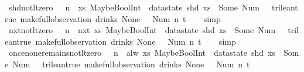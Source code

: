 \begin{isabellebody}
\ shd{\isacharunderscore}not{\isacharunderscore}lt{\isacharunderscore}zero{\isacharcolon}\ {\isachardoublequoteopen}{}\ {\isasymle}\ n\ {\isasymLongrightarrow}\ {\isacharparenleft}{\isasymlambda}xs{\isachardot}\ MaybeBoolInt\ {\isacharparenleft}{\isacharless}{\isacharparenright}\ {\isacharparenleft}datastate\ {\isacharparenleft}shd\ xs{\isacharparenright}\ {\isacharparenleft}{}{\isacharparenright}{\isacharparenright}\ {\isacharparenleft}Some\ {\isacharparenleft}Num\ {}{\isacharparenright}{\isacharparenright}\ {\isasymnoteq}\ trilean{\isachardot}true{\isacharparenright}\ {\isacharparenleft}make{\isacharunderscore}full{\isacharunderscore}observation\ drinks\ None\ {\isacharless}{}\ {\isacharcolon}{\isacharequal}\ Num\ n{\isachargreater}\ t{\isacharparenright}{\isachardoublequoteclose}\isanewline
%
\isadelimproof
\ \ %
\endisadelimproof
%
\isatagproof
{}\isamarkupfalse%
\ simp%
\endisatagproof
{\isafoldproof}%
%
\isadelimproof
\isanewline
%
\endisadelimproof
\isanewline
{}\isamarkupfalse%
\ nxt{\isacharunderscore}not{\isacharunderscore}lt{\isacharunderscore}zero{\isacharcolon}\ {\isachardoublequoteopen}{}\ {\isasymle}\ n\ {\isasymLongrightarrow}\ nxt\ {\isacharparenleft}{\isasymlambda}xs{\isachardot}\ MaybeBoolInt\ {\isacharparenleft}{\isacharless}{\isacharparenright}\ {\isacharparenleft}datastate\ {\isacharparenleft}shd\ xs{\isacharparenright}\ {\isacharparenleft}{}{\isacharparenright}{\isacharparenright}\ {\isacharparenleft}Some\ {\isacharparenleft}Num\ {}{\isacharparenright}{\isacharparenright}\ {\isasymnoteq}\ trilean{\isachardot}true{\isacharparenright}\ {\isacharparenleft}make{\isacharunderscore}full{\isacharunderscore}observation\ drinks\ None\ {\isacharless}{}\ {\isacharcolon}{\isacharequal}\ Num\ n{\isachargreater}\ t{\isacharparenright}{\isachardoublequoteclose}\isanewline
%
\isadelimproof
\ \ %
\endisadelimproof
%
\isatagproof
{}\isamarkupfalse%
\ simp%
\endisatagproof
{\isafoldproof}%
%
\isadelimproof
\isanewline
%
\endisadelimproof
\isanewline
{}\isamarkupfalse%
\ once{\isacharunderscore}none{\isacharunderscore}remains{\isacharunderscore}not{\isacharunderscore}lt{\isacharunderscore}zero{\isacharcolon}\ {\isachardoublequoteopen}{}\ {\isasymle}\ n\ {\isasymLongrightarrow}\ alw\ {\isacharparenleft}{\isasymlambda}xs{\isachardot}\ MaybeBoolInt\ {\isacharparenleft}{\isacharless}{\isacharparenright}\ {\isacharparenleft}datastate\ {\isacharparenleft}shd\ xs{\isacharparenright}\ {\isacharparenleft}{}{\isacharparenright}{\isacharparenright}\ {\isacharparenleft}Some\ {\isacharparenleft}Num\ {}{\isacharparenright}{\isacharparenright}\ {\isasymnoteq}\ trilean{\isachardot}true{\isacharparenright}\ {\isacharparenleft}make{\isacharunderscore}full{\isacharunderscore}observation\ drinks\ None\ {\isacharless}{}\ {\isacharcolon}{\isacharequal}\ Num\ n{\isachargreater}\ t{\isacharparenright}{\isachardoublequoteclose}\isanewline

\end{isabellebody}
